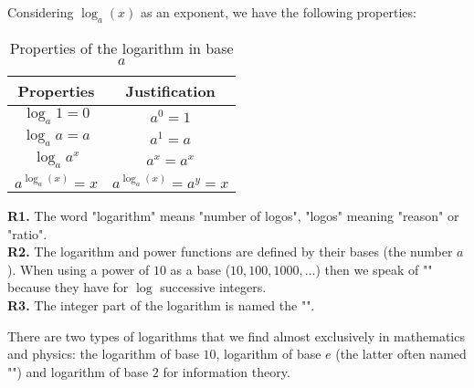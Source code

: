 	
	Considering $\log_a(x)$ as an exponent, we have the following properties:	
	\begin{table}[H]
		\centering
		\begin{tabular}{|c|c|}
			  \hline
			  \rowcolor[gray]{0.75}\textbf{Properties} & \textbf{Justification} \\ \hline
			  $\log_a1=0$ & $a^0=1$ \\ \hline
			  $\log_aa=a$ & $a^1=a$ \\ \hline
			  $\log_aa^x$ & $a^x=a^x$ \\ \hline
			  $a^{\log_a(x)}=x$ & $a^{\log_a(x)}=a^y=x$ \\
			  \hline
		\end{tabular}
		\caption{Properties of the logarithm in base $a$}
	\end{table}
	\begin{figure}[H]
		\centering
	\end{figure}
	\begin{tcolorbox}[title=Remarks,arc=10pt,breakable,drop lifted shadow,
  skin=enhanced,
  skin first is subskin of={enhancedfirst}{arc=10pt,no shadow},
  skin middle is subskin of={enhancedmiddle}{arc=10pt,no shadow},
  skin last is subskin of={enhancedlast}{drop lifted shadow}]
	\textbf{R1.} The word "logarithm" means "number of logos", "logos" meaning "reason" or "ratio".\\
	
	\textbf{R2.} The logarithm and power functions are defined by their bases (the number $a$). When using a power of $10$ as a base ($10, 100, 1000, \ldots $) then we speak of "" because they have for $\log$ successive integers.\\
	
	\textbf{R3.} The integer part of the logarithm is named the "".
	\end{tcolorbox}
	There are two types of logarithms that we find almost exclusively in mathematics and physics: the logarithm of base $10$, logarithm of base $e$ (the latter often named "") and logarithm of base $2$ for information theory.
	
